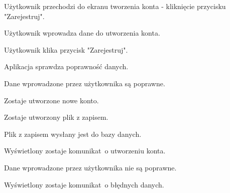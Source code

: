 \documentclass[12pt,a4paper]{article} %
\begin{document}
\hfill \break
\begin{usecase}
	\noaka
	\addpath
	\begin{usecases}
		\item Użytkownik przechodzi do ekranu tworzenia konta - kliknięcie przycisku "Zarejestruj".
		\item Użytkownik wprowadza dane do utworzenia konta.
		\item Użytkownik klika przycisk "Zarejestruj".
		\item Aplikacja sprawdza poprawność danych.
		\begin{usecases}
			\item Dane wprowadzone przez użytkownika są poprawne.
			\begin{usecases}
				\item Zostaje utworzone nowe konto.
				\item Zostaje utworzony plik z zapisem.
				\item Plik z zapisem wysłany jest do bazy danych.
				\item Wyświetlony zostaje komunikat~o utworzeniu konta.
			\end{usecases}
			\item Dane wprowadzone przez użytkownika nie są poprawne.
			\begin{usecases}
				\item Wyświetlony zostaje komunikat~o błędnych danych.
			\end{usecases}
		\end{usecases}
	\end{usecases}
\end{usecase}
\end{document}
